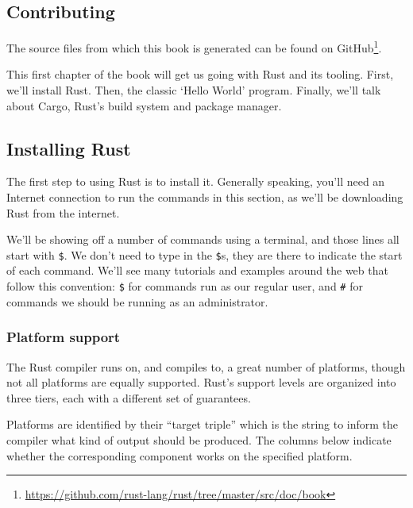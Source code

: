 \documentclass[a4paper,]{book}
\renewcommand{\href}[2]{#2\footnote{\url{#1}}}
\begin{document}
\subsection{Contributing}\label{contributing}

The source files from which this book is generated can be found on
\href{https://github.com/rust-lang/rust/tree/master/src/doc/book}{GitHub}.


This first chapter of the book will get us going with Rust and its
tooling. First, we'll install Rust. Then, the classic `Hello World'
program. Finally, we'll talk about Cargo, Rust's build system and
package manager.

\subsection{Installing Rust}\label{installing-rust}

The first step to using Rust is to install it. Generally speaking,
you'll need an Internet connection to run the commands in this section,
as we'll be downloading Rust from the internet.

We'll be showing off a number of commands using a terminal, and those
lines all start with \texttt{\$}. We don't need to type in the
\texttt{\$}s, they are there to indicate the start of each command.
We'll see many tutorials and examples around the web that follow this
convention: \texttt{\$} for commands run as our regular user, and
\texttt{\#} for commands we should be running as an administrator.

\subsubsection{Platform support}\label{platform-support}

The Rust compiler runs on, and compiles to, a great number of platforms,
though not all platforms are equally supported. Rust's support levels
are organized into three tiers, each with a different set of guarantees.

Platforms are identified by their ``target triple'' which is the string
to inform the compiler what kind of output should be produced. The
columns below indicate whether the corresponding component works on the
specified platform.
\end{document}

